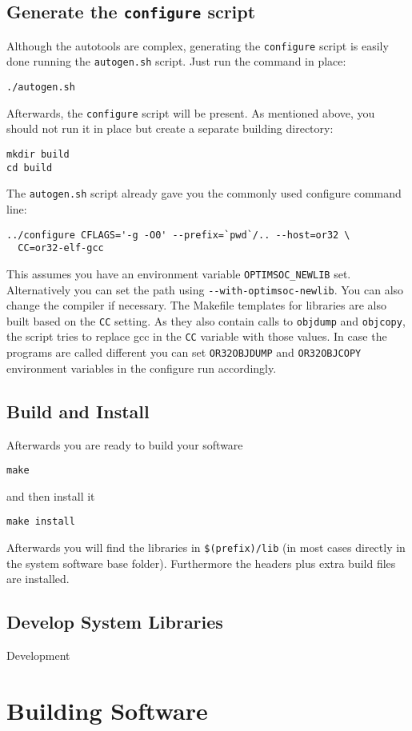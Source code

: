 \subsection{Generate the \texttt{configure} script}

Although the autotools are complex, generating the \verb|configure|
script is easily done running the \verb|autogen.sh| script. Just run
the command in place:

\lstset{language=sh}
\begin{verbatim}
./autogen.sh
\end{verbatim}

Afterwards, the \verb|configure| script will be present. As mentioned
above, you should not run it in place but create a separate building
directory:

\begin{verbatim}
mkdir build
cd build
\end{verbatim}

The \verb|autogen.sh| script already gave you the commonly used
configure command line:

\begin{verbatim}
../configure CFLAGS='-g -O0' --prefix=`pwd`/.. --host=or32 \
  CC=or32-elf-gcc
\end{verbatim}

This assumes you have an environment variable \verb|OPTIMSOC_NEWLIB|
set. Alternatively you can set the path using
\verb|--with-optimsoc-newlib|. You can also change the compiler if
necessary. The Makefile templates for libraries are also built based
on the \verb|CC| setting. As they also contain calls to \verb|objdump|
and \verb|objcopy|, the script tries to replace gcc in the \verb|CC|
variable with those values. In case the programs are called different
you can set \verb|OR32OBJDUMP| and \verb|OR32OBJCOPY| environment
variables in the configure run accordingly.

\subsection{Build and Install}

Afterwards you are ready to build your software

\begin{verbatim}
make
\end{verbatim}

and then install it

\begin{verbatim}
make install
\end{verbatim}

Afterwards you will find the libraries in \verb|$(prefix)/lib| (in
most cases directly in the system software base folder). Furthermore
the headers plus extra build files are installed.

\subsection{Develop System Libraries}

Development

\section{Building Software}